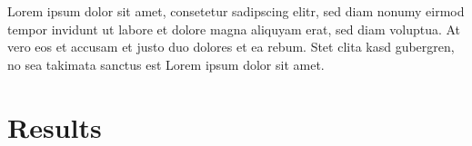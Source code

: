 \documentclass[10pt,conference,compsocconf]{IEEEtran}
\begin{document}




Lorem ipsum dolor sit amet, consetetur sadipscing elitr, sed diam nonumy eirmod
tempor invidunt ut labore et dolore magna aliquyam erat, sed diam voluptua. At
vero eos et accusam et justo duo dolores et ea rebum. Stet clita kasd gubergren,
no sea takimata sanctus est Lorem ipsum dolor sit amet.


\section{Results}
\label{sec:results}
\end{document}

